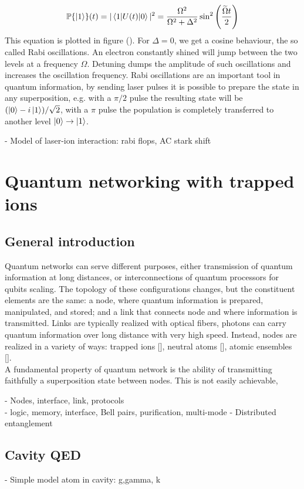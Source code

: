 \begin{equation}
\mathbb{P}\{\ket{1}\}(t) = |\braket{1|U(t)|0}|^2 = \frac{\Omega^2}{\Omega^2+\Delta^2} \sin^2\left(\frac{\widetilde{\Omega}t}{2} \right)
\end{equation}
This equation is plotted in figure (). For $\Delta = 0$, we get a cosine behaviour, the so called Rabi oscillations. An electron constantly shined will jump between the two levels at a frequency $\Omega$. Detuning dumps the amplitude of such oscillations and increases the oscillation frequency. Rabi oscillations are an important tool in quantum information, by sending laser pulses it is possible to prepare the state in any superposition, e.g. with a $\pi/2$ pulse the resulting state will be $(\ket{0} - i\ket{1})/\sqrt{2}$, with a $\pi$ pulse the population is completely transferred to another level $\ket{0}\to \ket{1}$.

- Model of laser-ion interaction: rabi flops, AC stark shift
\section{Quantum networking with trapped ions}
\subsection{General introduction}
Quantum networks can serve different purposes, either transmission of quantum information at long distances, or interconnections of quantum processors for qubits scaling. The topology of these configurations changes, but the constituent elements are the same: a node, where quantum information is prepared, manipulated, and stored; and a link that connects node and where information is transmitted. Links are typically realized with optical fibers, photons can carry quantum information over long distance with very high speed. Instead, nodes are realized in a variety of ways: trapped ions [], neutral atoms [], atomic ensembles [].\\
A fundamental property of quantum network is the ability of transmitting faithfully a superposition state between nodes. This is not easily achievable,






- Nodes, interface, link, protocols\\
- logic, memory, interface, Bell pairs, purification, multi-mode
- Distributed entanglement
\subsection{Cavity QED}
- Simple model atom in cavity: g,gamma, k
